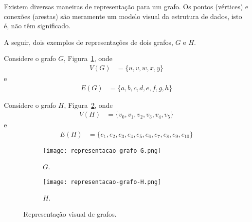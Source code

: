 Existem diversas maneiras de representação para um grafo. Os pontos (vértices) e conexões (arestas) são meramente um modelo visual da estrutura de dados, isto é, não têm significado.

A seguir, dois exemplos de representações de dois grafos, $G$ e $H$.

\begin{example}
    Considere o grafo $G$, Figura~\ref{sec2:ex-repr-grafo-G}, onde
    \begin{align*}
        V(G) &= \{u, v, w, x, y\}
    \end{align*}
    e
    \begin{align*}
        E(G) &= \{a, b, c, d, e, f, g, h\}
    \end{align*}
\end{example}

\begin{example}
    Considere o grafo $H$, Figura~\ref{sec2:ex-repr-grafo-H}, onde
    \begin{align*}
        V(H) &= \{v_0, v_1, v_2, v_3, v_4, v_5\}
    \end{align*}
    e
    \begin{align*}
        E(H) &= \{e_1, e_2, e_3, e_4, e_5, e_6, e_7, e_8, e_9, e_{10}\}
    \end{align*}
\end{example}

\begin{figure}[!htb]
    \centering
    \begin{subfigure}{.5\textwidth}
        \centering
        \texttt{[image: representacao-grafo-G.png]}
        \caption{$G$.}
        \label{sec2:ex-repr-grafo-G}
    \end{subfigure}%
    \begin{subfigure}{.5\textwidth}
        \centering
        \texttt{[image: representacao-grafo-H.png]}
        \caption{$H$.}
        \label{sec2:ex-repr-grafo-H}
    \end{subfigure}
    \caption{Representação visual de grafos.}
    \label{sec2:ex-repr-grafo-G-H}
\end{figure}

